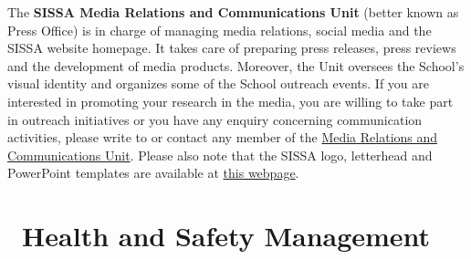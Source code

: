 \documentclass{sissavademecum}
\begin{document}
The \textbf{SISSA Media Relations and Communications Unit} (better known as Press Office) is in charge of managing media relations, social media and the SISSA website homepage. It takes care of preparing press releases, press reviews and the development of media products. Moreover, the Unit oversees the School's visual identity and organizes some of the School outreach events. If you are interested in promoting your research in the media, you are willing to take part in outreach initiatives or you have any enquiry concerning communication activities, please write to  or contact any member of the \href{https://www.sissa.it/media-and-press}{Media Relations and Communications Unit}. Please also note that the SISSA logo, letterhead and PowerPoint templates are available at \href{https://www.sissa.it/researchers-and-sissa-staff}{this webpage}.


\chapter{\texorpdfstring{\faUserShield\ }{}Health and Safety Management}
\end{document}
